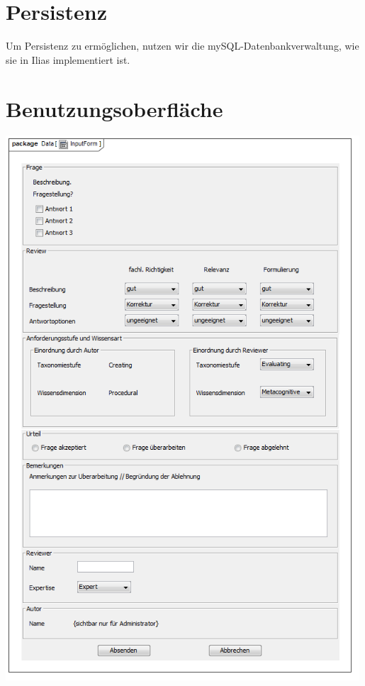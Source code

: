 \documentclass[a4paper]{scrreprt}
\begin{document}
\section{Persistenz}
Um Persistenz zu ermöglichen, nutzen wir die mySQL-Datenbankverwaltung, wie sie in Ilias implementiert ist.
\section{Benutzungsoberfläche}
\includegraphics[width=0.99\textwidth]{User_Interface_Modeling_Diagram__InputForm.png}
\label{Grafische Benutzeroberfläche}\\
\end{document}
